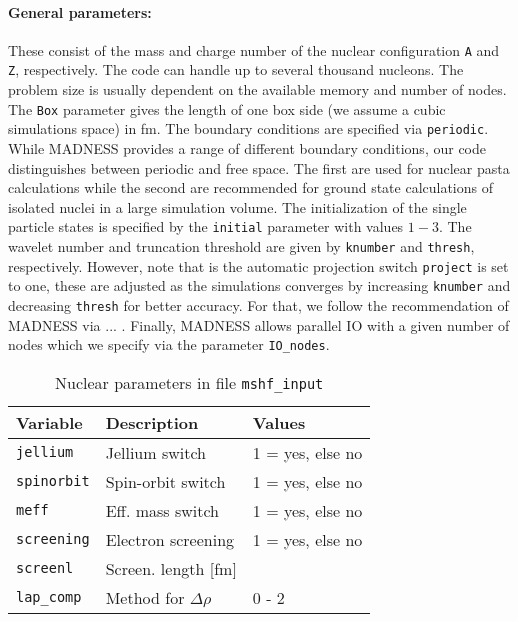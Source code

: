 \documentclass[4p]{elsarticle}
\begin{document}
\paragraph{General parameters:} These consist of the mass and charge number of the nuclear configuration {\tt A} and {\tt Z}, respectively. The code can handle up to several thousand nucleons. The problem size is usually dependent on the available memory and number of nodes. The {\tt Box} parameter gives the length of one box side (we assume a cubic simulations space) in fm. The boundary conditions are specified via {\tt periodic}. While {\sc MADNESS} provides a range of different boundary conditions, our code distinguishes between periodic and free space. The first are used for nuclear pasta calculations while the second are recommended for ground state calculations of isolated nuclei in a large simulation volume. The initialization of the single particle states is specified by the {\tt initial} parameter with values $1-3$. The wavelet number and truncation threshold are given by {\tt knumber} and {\tt thresh}, respectively. However, note that is the automatic projection switch {\tt project} is set to one, these are adjusted as the simulations converges by increasing {\tt knumber} and decreasing {\tt thresh} for better accuracy. For that, we follow the recommendation of {\sc MADNESS} via ... . Finally, {\sc MADNESS} allows parallel IO with a given number of nodes which we specify via the parameter {\tt IO\_nodes}.
\begin{table}
\caption{Nuclear parameters in file \texttt{mshf\_input}}
\begin{tabular*}{\columnwidth}{ l l l}
\hline
\hline
Variable & Description & Values\\
\hline
\texttt{jellium}              & Jellium switch                & 1 = yes, else no\\
\texttt{spinorbit}           & Spin-orbit switch                               & 1 = yes, else no\\
\texttt{meff}                  & Eff. mass switch                   & 1 = yes, else no\\
\texttt{screening}         & Electron screening                            & 1 = yes, else no\\
\texttt{screenl}             & Screen. length [fm]                         &  \\
\texttt{lap\_comp}         & Method for $\Delta \rho$                & 0 - 2 \\
\hline
\hline
\end{tabular*}
\label{table2}
\end{table}
\end{document}
